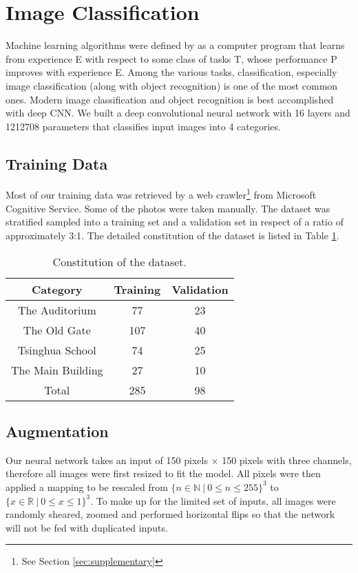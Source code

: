 \section{Image Classification}
Machine learning algorithms were defined by \cite{mitchell1997machine} as a computer program that learns from experience E with respect to some class of tasks T, whose performance P improves with experience E. Among the various tasks, classification, especially image classification (along with object recognition) is one of the most common ones. Modern image classification\cite{ioffe2015batch, krizhevsky2012imagenet} and object recognition\cite{taigman2014deepface} is best accomplished with deep CNN. We built a deep convolutional neural network with 16 layers and 1212708 parameters that classifies input images into 4 categories.
\subsection{Training Data}
Most of our training data was retrieved by a web crawler\footnote{See Section \ref{sec:supplementary}} from Microsoft Cognitive Service. Some of the photos were taken manually. The dataset was stratified sampled into a training set and a validation set in respect of a ratio of approximately 3:1. The detailed constitution of the dataset is listed in Table \ref{tab:dataset}.
\begin{table}[htbp]
\centering
\begin{tabular}{c | c c}
\hline
Category & Training & Validation \\
\hline
The Auditorium & 77 & 23\\
The Old Gate & 107 & 40\\
Tsinghua School & 74 & 25\\
The Main Building & 27 & 10\\
\hline
Total & 285 & 98\\
\hline
\end{tabular}
\caption{Constitution of the dataset.}
\label{tab:dataset}
\end{table}
\subsection{Augmentation}
Our neural network takes an input of 150 pixels $\times$ 150 pixels with three channels, therefore all images were first resized to fit the model. All pixels were then applied a mapping to be rescaled from
 $\{n\in\mathbb{N}~|~0\leq n \leq 255\}^3$ to $\{x\in\mathbb{R}~|~0\leq x \leq 1\}^3$. To make up for the limited set of inputs, all images were randomly sheared, zoomed and performed horizontal flips so that the network will not be fed with duplicated inputs.
